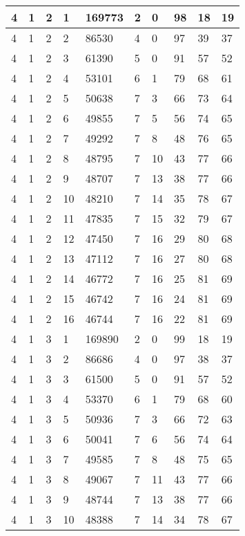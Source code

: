 \begin{table}[!ht]
\begin{tabular}{|l|l|l|l|l|l|l|l|l|l|}
        4 & 1 & 2 & 1 & 169773 & 2 & 0 & 98 & 18 & 19 \\ \hline
        4 & 1 & 2 & 2 & 86530 & 4 & 0 & 97 & 39 & 37 \\ \hline
        4 & 1 & 2 & 3 & 61390 & 5 & 0 & 91 & 57 & 52 \\ \hline
        4 & 1 & 2 & 4 & 53101 & 6 & 1 & 79 & 68 & 61 \\ \hline
        4 & 1 & 2 & 5 & 50638 & 7 & 3 & 66 & 73 & 64 \\ \hline
        4 & 1 & 2 & 6 & 49855 & 7 & 5 & 56 & 74 & 65 \\ \hline
        4 & 1 & 2 & 7 & 49292 & 7 & 8 & 48 & 76 & 65 \\ \hline
        4 & 1 & 2 & 8 & 48795 & 7 & 10 & 43 & 77 & 66 \\ \hline
        4 & 1 & 2 & 9 & 48707 & 7 & 13 & 38 & 77 & 66 \\ \hline
        4 & 1 & 2 & 10 & 48210 & 7 & 14 & 35 & 78 & 67 \\ \hline
        4 & 1 & 2 & 11 & 47835 & 7 & 15 & 32 & 79 & 67 \\ \hline
        4 & 1 & 2 & 12 & 47450 & 7 & 16 & 29 & 80 & 68 \\ \hline
        4 & 1 & 2 & 13 & 47112 & 7 & 16 & 27 & 80 & 68 \\ \hline
        4 & 1 & 2 & 14 & 46772 & 7 & 16 & 25 & 81 & 69 \\ \hline
        4 & 1 & 2 & 15 & 46742 & 7 & 16 & 24 & 81 & 69 \\ \hline
        4 & 1 & 2 & 16 & 46744 & 7 & 16 & 22 & 81 & 69 \\ \hline
        4 & 1 & 3 & 1 & 169890 & 2 & 0 & 99 & 18 & 19 \\ \hline
        4 & 1 & 3 & 2 & 86686 & 4 & 0 & 97 & 38 & 37 \\ \hline
        4 & 1 & 3 & 3 & 61500 & 5 & 0 & 91 & 57 & 52 \\ \hline
        4 & 1 & 3 & 4 & 53370 & 6 & 1 & 79 & 68 & 60 \\ \hline
        4 & 1 & 3 & 5 & 50936 & 7 & 3 & 66 & 72 & 63 \\ \hline
        4 & 1 & 3 & 6 & 50041 & 7 & 6 & 56 & 74 & 64 \\ \hline
        4 & 1 & 3 & 7 & 49585 & 7 & 8 & 48 & 75 & 65 \\ \hline
        4 & 1 & 3 & 8 & 49067 & 7 & 11 & 43 & 77 & 66 \\ \hline
        4 & 1 & 3 & 9 & 48744 & 7 & 13 & 38 & 77 & 66 \\ \hline
        4 & 1 & 3 & 10 & 48388 & 7 & 14 & 34 & 78 & 67 \\ \hline

\end{tabular}
\end{table}
